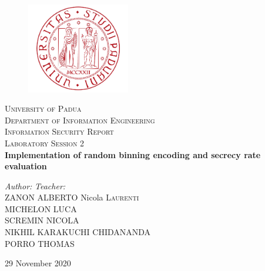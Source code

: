 \documentclass{report}
\begin{document}
\begin{titlepage}
\begin{center}
\vspace*{0.8cm}
\begin{figure}[H]
\centering
\includegraphics[width=0.4\textwidth]{logo_uni}
\end{figure}
\LARGE{\textsc{University of Padua}}\\
\vspace*{0.1cm}
\Large{\textsc{Department of Information Engineering}}\\
\vspace*{1.0cm}
\Large{\textsc{Information Security Report}}\\
\vspace*{0.1cm}
\Large{\textsc{Laboratory Session 2}}\\
\vspace*{0.8cm}
\huge{\textbf{Implementation of random binning encoding and secrecy rate
evaluation}}\\
\vspace*{1cm}
\end{center}
\large{\textit{Author:}}
\hfill
\large{\textit{Teacher:}} \\
\large{ZANON \textsc{ALBERTO}}
\hfill
\large{Nicola \textsc{Laurenti}}\\
\large{MICHELON \textsc{LUCA}}\\
\large{SCREMIN\textsc{ NICOLA}}\\
\large{NIKHIL \textsc{KARAKUCHI CHIDANANDA }}\\
\large{PORRO \textsc{THOMAS}}\\

\vspace*{0cm}
\begin{center}
\large{29 November 2020}\\
\end{center}
\end{titlepage}
\pagebreak


\setcounter{page}{1}
\end{document}

